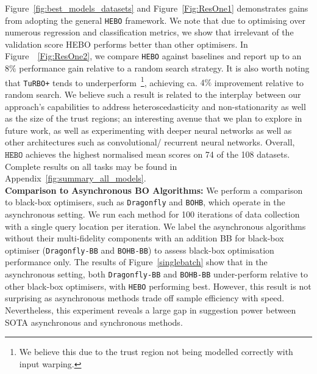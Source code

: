 \documentclass[jair,twoside,11pt,theapa]{article}
\theoremstyle{definition}
\begin{document}
Figure~\ref{fig:best_models_datasets} and Figure~\ref{Fig:ResOne1} demonstrates gains from adopting the general \texttt{HEBO} framework. We note that due to optimising over numerous regression and classification metrics, we show that irrelevant of the validation score HEBO performs better than other optimisers. In Figure~~\ref{Fig:ResOne2}, we compare \texttt{HEBO} against baselines and report up to an $8\%$ performance gain relative to a random search strategy. It is also worth noting that \texttt{TuRBO+} tends to underperform~\footnote{We believe this due to the trust region not being modelled correctly with input warping.}, achieving ca. $4 \%$ improvement relative to random search. We believe such a result is related to the interplay between our approach's capabilities to address heteroscedasticity and non-stationarity as well as the size of the trust regions; an interesting avenue that we plan to explore in future work, as well as experimenting with deeper neural networks as well as other architectures such as convolutional/ recurrent neural networks. Overall, $\texttt{HEBO}$ achieves the highest normalised mean scores on 74 of the 108 datasets. Complete results on all tasks may be found in Appendix~\ref{fig:summary_all_models}. \\







\textbf{Comparison to Asynchronous BO Algorithms:} We perform a comparison to black-box optimisers, such as \texttt{Dragonfly} and \texttt{BOHB}, which operate in the asynchronous setting. We run each method for 100 iterations of data collection with a single query location per iteration. We label the asynchronous algorithms without their multi-fidelity components with an addition BB for black-box optimiser (\texttt{Dragonfly-BB} and \texttt{BOHB-BB}) to assess black-box optimisation performance only. The results of Figure~\autoref{singlebatch} show that in the asynchronous setting, both \texttt{Dragonfly-BB} and \texttt{BOHB-BB} under-perform relative to other black-box optimisers, with \texttt{HEBO} performing best. However, this result is not surprising as asynchronous methods trade off sample efficiency with speed. Nevertheless, this experiment reveals a large gap in suggestion power between SOTA asynchronous and synchronous methods.
\end{document}
